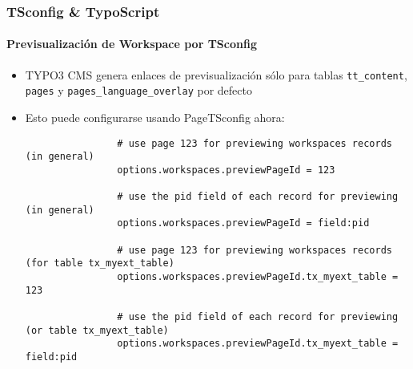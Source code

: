 \begin{frame}[fragile]
	\frametitle{TSconfig \& TypoScript}
	\framesubtitle{Previsualización de Workspace por TSconfig}

	\lstset{basicstyle=\tiny\ttfamily}

	\begin{itemize}

		\item TYPO3 CMS genera enlaces de previsualización sólo para tablas \texttt{tt\_content}, \texttt{pages} y
			\texttt{pages\_language\_overlay} por defecto

		\item Esto puede configurarse usando PageTSconfig ahora:

			\begin{lstlisting}
				# use page 123 for previewing workspaces records (in general)
				options.workspaces.previewPageId = 123

				# use the pid field of each record for previewing (in general)
				options.workspaces.previewPageId = field:pid

				# use page 123 for previewing workspaces records (for table tx_myext_table)
				options.workspaces.previewPageId.tx_myext_table = 123

				# use the pid field of each record for previewing (or table tx_myext_table)
				options.workspaces.previewPageId.tx_myext_table = field:pid
			\end{lstlisting}

	\end{itemize}

\end{frame}

